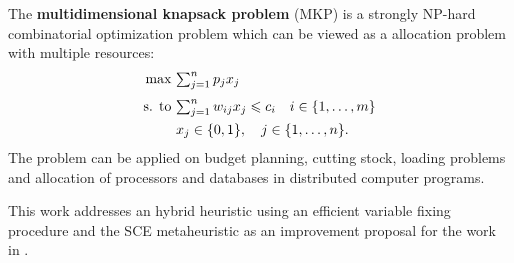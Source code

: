 The {\bf multidimensional knapsack problem} (MKP) is a strongly NP-hard combinatorial
optimization problem which can be viewed as a allocation problem with multiple resources:
\vspace{-17pt}
\begin{align*}
    \text{max} ~ & {\textstyle \sum_{j=1}^n p_j x_j} \\[3pt]
    \text{s. to} ~ & {\textstyle \sum_{j=1}^n w_{ij} x_j \leqslant c_i \quad i \in \{1, \ldots, m\}}\\
   & x_j \in \{0, 1\}, \quad j \in \{1, \ldots, n\}.
\end{align*}
The problem can be applied on budget planning,
cutting stock, loading problems and
allocation of processors and databases in distributed computer programs.

This work addresses an hybrid heuristic using an
efficient variable fixing procedure and the SCE metaheuristic as an improvement
proposal for the work in \cite{baroni2015shuffled}.
